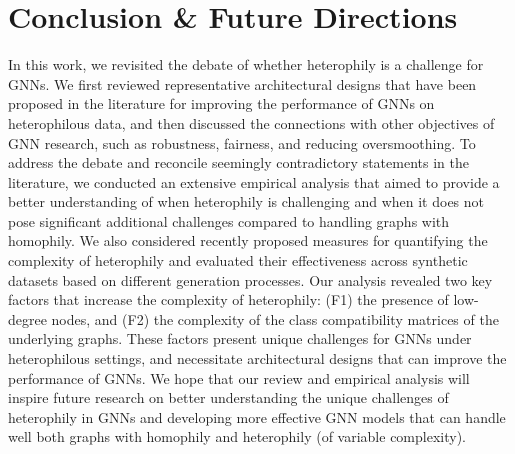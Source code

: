 \section{Conclusion \& Future Directions}
\label{sec:conclusion}

In this work, we revisited the debate of whether heterophily is a challenge for GNNs. 
We first reviewed representative architectural designs that have been proposed in the literature for improving the performance of GNNs on heterophilous data, and then discussed the connections with other objectives of GNN research, such as robustness, fairness, and reducing oversmoothing. 
To address the debate and reconcile seemingly contradictory statements in the literature, we conducted an extensive empirical analysis that aimed to provide a better understanding of when heterophily is challenging and when it does not pose significant additional challenges compared to handling graphs with homophily. 
We also considered recently proposed measures for quantifying the complexity of heterophily and evaluated their effectiveness across synthetic datasets based on different generation processes. 
Our analysis revealed two key factors that increase the complexity of heterophily: (F1) the presence of low-degree nodes, and (F2) the complexity of the class compatibility matrices of the underlying graphs. 
These factors present unique challenges for GNNs under heterophilous settings, and necessitate architectural designs that can improve the performance of GNNs. 
We hope that our review and empirical analysis will inspire future research 
on better understanding the unique challenges of heterophily in GNNs and  developing more effective GNN models that can handle well both graphs with homophily and heterophily (of variable complexity).



